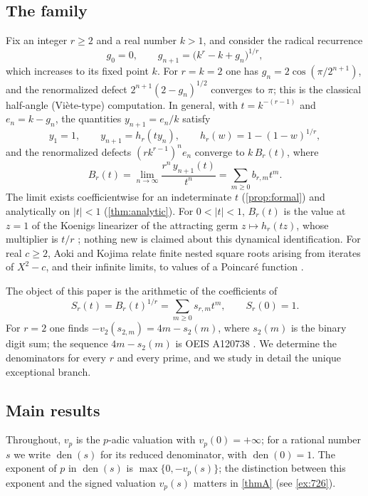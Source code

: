 \documentclass[11pt,reqno]{amsart}
\theoremstyle{definition}
\theoremstyle{remark}
\theoremstyle{plain}
\newcommand{\den}{\operatorname{den}}
\begin{document}
\subsection{The family}
Fix an integer $r\ge2$ and a real number $k>1$, and consider the radical recurrence
\begin{equation}\label{eq:real-rec}
g_0=0,\qquad g_{n+1}=\bigl(k^r-k+g_n\bigr)^{1/r},
\end{equation}
which increases to its fixed point $k$. For $r=k=2$ one has $g_n=2\cos(\pi/2^{n+1})$, and the renormalized defect $2^{n+1}(2-g_n)^{1/2}$ converges to $\pi$; this is the classical half-angle (Viète-type) computation. In general, with $t=k^{-(r-1)}$ and $e_n=k-g_n$, the quantities $y_{n+1}=e_n/k$ satisfy
\[
y_1=1,\qquad y_{n+1}=h_r(ty_n),\qquad h_r(w)=1-(1-w)^{1/r},
\]
and the renormalized defects $(rk^{r-1})^ne_n$ converge to $k\,B_r(t)$, where
\[
B_r(t)=\lim_{n\to\infty}\frac{r^n\,y_{n+1}(t)}{t^n}=\sum_{m\ge0}b_{r,m}t^m .
\]
The limit exists coefficientwise for an indeterminate $t$ (\cref{prop:formal}) and analytically on $|t|<1$ (\cref{thm:analytic}). For $0<|t|<1$, $B_r(t)$ is the value at $z=1$ of the Koenigs linearizer of the attracting germ $z\mapsto h_r(tz)$, whose multiplier is $t/r$ \cite{Koenigs1884,Milnor1991}; nothing new is claimed about this dynamical identification. For real $c\ge2$, Aoki and Kojima relate finite nested square roots arising from iterates of $X^2-c$, and their infinite limits, to values of a Poincar\'e function \cite[Thm.~6.7, Prop.~7.2, and Thm.~7.3]{AokiKojima2016}.

The object of this paper is the arithmetic of the coefficients of
\[
S_r(t)=B_r(t)^{1/r}=\sum_{m\ge0}s_{r,m}t^m,\qquad S_r(0)=1 .
\]
For $r=2$ one finds $-v_2(s_{2,m})=4m-s_2(m)$, where $s_2(m)$ is the binary digit sum; the sequence $4m-s_2(m)$ is OEIS A120738 \cite{OEISA120738}. We determine the denominators for every $r$ and every prime, and we study in detail the unique exceptional branch.

\subsection{Main results}
Throughout, $v_p$ is the $p$-adic valuation with $v_p(0)=+\infty$; for a rational number $s$ we write $\den(s)$ for its reduced denominator, with $\den(0)=1$. The exponent of $p$ in $\den(s)$ is $\max\{0,-v_p(s)\}$; the distinction between this exponent and the signed valuation $v_p(s)$ matters in \cref{thmA} (see \cref{ex:726}).
\end{document}
